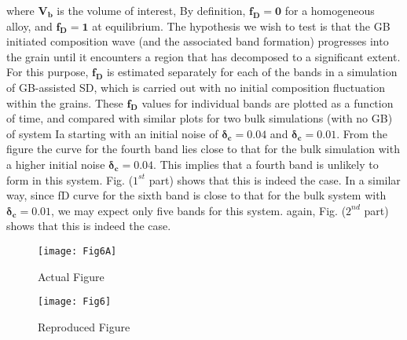 where $\mathbold{V_b}$ is the volume of interest,
By definition, $\mathbold{f_D=0}$ for a homogeneous alloy, and $\mathbold{f_D=1}$ at equilibrium.
The hypothesis we wish to test is that the GB initiated composition wave (and the associated band formation) progresses into the grain until it encounters a region that has decomposed to a significant extent. For this purpose, $\mathbold{f_D}$ is estimated separately for each of the bands in a simulation of GB-assisted SD, which is carried out with no initial composition fluctuation within the grains. 
These $\mathbold{f_D}$ values for individual bands are plotted as a function of time, and compared with similar plots for two bulk simulations (with no GB) of system Ia starting with an initial noise of $\mathbold{\delta_c = 0.04}$ and $\mathbold{\delta_c = 0.01}$.
From the figure the curve for the fourth band lies close to that for the bulk simulation with a higher initial noise $\mathbold{\delta_c = 0.04}$. This implies that a fourth band is unlikely to form in this system. Fig. \label{3A} ($1^{st}$ part) shows that this is indeed the case.
In a similar way, since fD curve for the sixth band is close to that for the bulk system with $\mathbold{\delta_c = 0.01}$, we may expect only five bands for this system. again, Fig. \label{3A} ($2^{nd}$ part) shows that this is indeed the case.

\begin{figure}[H]
\texttt{[image: Fig6A]}
\caption{Actual Figure}
\end{figure}

\begin{figure}[H]
\texttt{[image: Fig6]}
\caption{Reproduced Figure}
\end{figure}



